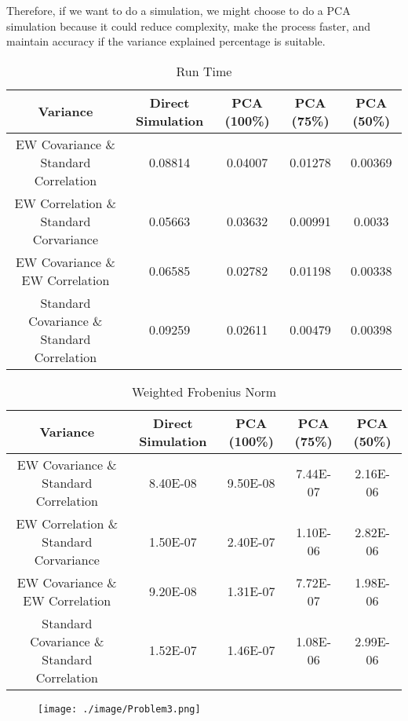 \documentclass[11pt,en]{elegantpaper}
\begin{document}
 Therefore, if we want to do a simulation, we might choose to do a PCA simulation because it could reduce 
 complexity, make the process faster, and maintain accuracy if the variance explained percentage is suitable. 

\begin{table}[htbp]
    \centering
    \caption{Run Time}
    \label{table1}
    \begin{tabular}{@{}ccccc@{}}
        \toprule
        \textbf{Variance} & \textbf{Direct Simulation} & \textbf{PCA (100\%)} & \textbf{PCA (75\%)} & \textbf{PCA (50\%)}\\
        \midrule
        EW Covariance \& Standard Correlation & 0.08814 & 0.04007 & 0.01278 & 0.00369  \\ 
        EW Correlation \& Standard Corvariance & 0.05663 & 0.03632 & 0.00991 & 0.0033  \\ 
        EW Covariance \& EW Correlation & 0.06585 & 0.02782 & 0.01198 & 0.00338  \\ 
        Standard Covariance \& Standard Correlation & 0.09259 & 0.02611 & 0.00479 & 0.00398 \\ 
        \bottomrule
    \end{tabular}
\end{table}

\begin{table}[htbp]
    \centering
    \caption{Weighted Frobenius Norm}
    \label{table2}
    \begin{tabular}{@{}ccccc@{}}
        \toprule
        \textbf{Variance} & \textbf{Direct Simulation} & \textbf{PCA (100\%)} & \textbf{PCA (75\%)} & \textbf{PCA (50\%)}\\
        \midrule
        EW Covariance \& Standard Correlation & 8.40E-08 & 9.50E-08 & 7.44E-07 & 2.16E-06  \\ 
        EW Correlation \& Standard Corvariance & 1.50E-07 & 2.40E-07 & 1.10E-06 & 2.82E-06  \\ 
        EW Covariance \& EW Correlation & 9.20E-08 & 1.31E-07 & 7.72E-07 & 1.98E-06  \\ 
        Standard Covariance \& Standard Correlation & 1.52E-07 & 1.46E-07 & 1.08E-06 & 2.99E-06 \\ 
        \bottomrule
    \end{tabular}
\end{table}

\newpage
\begin{figure}[htbp] 
    \centering 
    \texttt{[image: ./image/Problem3.png]} 
\end{figure}
\end{document}
